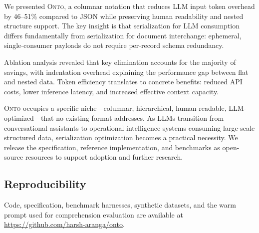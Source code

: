 \documentclass[10pt,twocolumn]{article}
\newcommand{\onto}{\textsc{Onto}\xspace}
\begin{document}
We presented \onto, a columnar notation that reduces LLM input token overhead by 46--51\% compared to JSON while preserving human readability and nested structure support. The key insight is that serialization for LLM consumption differs fundamentally from serialization for document interchange: ephemeral, single-consumer payloads do not require per-record schema redundancy.

Ablation analysis revealed that key elimination accounts for the majority of savings, with indentation overhead explaining the performance gap between flat and nested data. Token efficiency translates to concrete benefits: reduced API costs, lower inference latency, and increased effective context capacity.

\onto occupies a specific niche---columnar, hierarchical, human-readable, LLM-optimized---that no existing format addresses. As LLMs transition from conversational assistants to operational intelligence systems consuming large-scale structured data, serialization optimization becomes a practical necessity. We release the specification, reference implementation, and benchmarks as open-source resources to support adoption and further research.

\subsection*{Reproducibility}

Code, specification, benchmark harnesses, synthetic datasets, and the warm prompt used for comprehension evaluation are available at \url{https://github.com/harsh-aranga/onto}.
\end{document}
